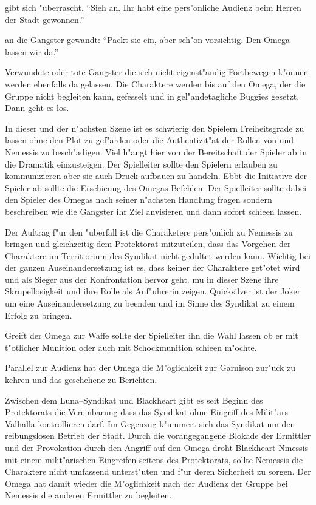 \xlsn{} gibt sich "uberrascht. "`Sieh an. Ihr habt eine pers"onliche Audienz beim Herren der Stadt gewonnen."'

\xlsn{} an die Gangster gewandt: "`Packt sie ein, aber sch"on vorsichtig. Den Omega lassen wir da."'

Verwundete oder tote Gangster die sich nicht eigenst"andig Fortbewegen k"onnen werden ebenfalls da gelassen. Die Charaktere werden bis auf den Omega, der die Gruppe nicht begleiten kann, gefesselt und in gel"andetagliche Buggies gesetzt. Dann geht es los.

\begin{remarks}
	In dieser und der n"achsten Szene ist es schwierig den Spielern Freiheitsgrade zu lassen ohne den Plot zu gef"arden oder die Authentizit"at der Rollen von \xl{} und Nemessis zu besch"adigen. Viel h"angt hier von der Bereitschaft der Spieler ab in die Dramatik einzusteigen. Der Spielleiter sollte den Spielern erlauben zu kommunizieren aber sie auch Druck aufbauen zu handeln. Ebbt die Initiative der Spieler ab sollte \xl{} die Erschie\3ung des Omegas Befehlen. Der Spielleiter sollte dabei den Spieler des Omegas nach seiner n"achsten Handlung fragen sondern beschreiben wie die Gangster ihr Ziel anvisieren und dann sofort schie\3en lassen.

	Der Auftrag f"ur den "uberfall ist die Charaketere pers"onlich zu Nemessis zu bringen und gleichzeitig dem Protektorat mitzuteilen, dass das Vorgehen der Charaktere im Territiorium des Syndikat nicht gedultet werden kann. Wichtig bei der ganzen Auseinandersetzung ist es, dass keiner der Charaktere get"otet wird und \xl{} als Sieger aus der Konfrontation hervor geht. \xl{} mu\3 in dieser Szene ihre Skrupellosigkeit und ihre Rolle als Anf"uhrerin zeigen. Quicksilver ist der Joker um eine Auseinandersetzung zu beenden und im Sinne des Syndikat zu einem Erfolg zu bringen.

	Greift der Omega zur Waffe sollte der Spielleiter ihn die Wahl lassen ob er mit t"otlicher Munition oder auch mit Schockmunition schie\3en m"ochte.
\end{remarks}



Parallel zur Audienz hat der Omega die M"oglichkeit zur Garnison zur"uck zu kehren und das geschehene zu Berichten. 

Zwischen dem Luna--Syndikat und Blackheart gibt es seit Beginn des Protektorats die Vereinbarung dass das Syndikat ohne Eingriff des Milit"ars Valhalla kontrollieren darf. Im Gegenzug k"ummert sich das Syndikat um den reibungslosen Betrieb der Stadt. Durch die  vorangegangene Blokade der Ermittler und der Provokation durch den Angriff auf den Omega droht Blackheart Nmessis mit einem milit"arischen Eingreifen seitens des Protektorats, sollte Nemessis die Charaktere nicht umfassend unterst"uten und f"ur deren Sicherheit zu sorgen. Der Omega hat damit wieder die M"oglichkeit nach der Audienz der Gruppe bei Nemessis die anderen Ermittler zu begleiten.


